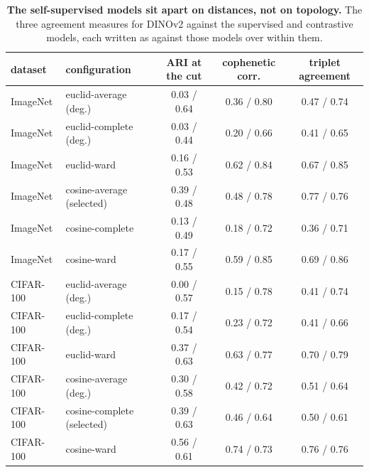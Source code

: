 \begin{table}[H]
\centering
\scriptsize
\setlength{\tabcolsep}{3pt}
\begingroup
\setlength{\tabcolsep}{3pt}
\begin{tabular}{ll|ccc}
\toprule
dataset & configuration & ARI at the cut & cophenetic corr. & triplet agreement \\
\midrule
ImageNet & euclid-average (deg.) & 0.03 / 0.64 & 0.36 / 0.80 & 0.47 / 0.74 \\
ImageNet & euclid-complete (deg.) & 0.03 / 0.44 & 0.20 / 0.66 & 0.41 / 0.65 \\
ImageNet & euclid-ward & 0.16 / 0.53 & 0.62 / 0.84 & 0.67 / 0.85 \\
ImageNet & cosine-average (selected) & 0.39 / 0.48 & 0.48 / 0.78 & 0.77 / 0.76 \\
ImageNet & cosine-complete & 0.13 / 0.49 & 0.18 / 0.72 & 0.36 / 0.71 \\
ImageNet & cosine-ward & 0.17 / 0.55 & 0.59 / 0.85 & 0.69 / 0.86 \\
\midrule
CIFAR-100 & euclid-average (deg.) & 0.00 / 0.57 & 0.15 / 0.78 & 0.41 / 0.74 \\
CIFAR-100 & euclid-complete (deg.) & 0.17 / 0.54 & 0.23 / 0.72 & 0.41 / 0.66 \\
CIFAR-100 & euclid-ward & 0.37 / 0.63 & 0.63 / 0.77 & 0.70 / 0.79 \\
CIFAR-100 & cosine-average (deg.) & 0.30 / 0.58 & 0.42 / 0.72 & 0.51 / 0.64 \\
CIFAR-100 & cosine-complete (selected) & 0.39 / 0.63 & 0.46 / 0.64 & 0.50 / 0.61 \\
CIFAR-100 & cosine-ward & 0.56 / 0.61 & 0.74 / 0.73 & 0.76 / 0.76 \\
\bottomrule
\end{tabular}
\par\vspace{2pt}
\endgroup
\caption{\textbf{The self-supervised models sit apart on distances, not on topology.} The three agreement measures for DINOv2 against the supervised and contrastive models, each written as against those models over within them.
}
\label{tab:q6-treemap-b}
\end{table}
